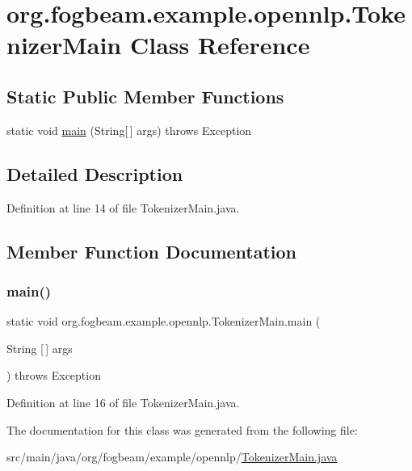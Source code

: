 \hypertarget{classorg_1_1fogbeam_1_1example_1_1opennlp_1_1_tokenizer_main}{}\section{org.\+fogbeam.\+example.\+opennlp.\+Tokenizer\+Main Class Reference}
\label{classorg_1_1fogbeam_1_1example_1_1opennlp_1_1_tokenizer_main}
\subsection*{Static Public Member Functions}
\begin{DoxyCompactItemize}
\item 
static void \hyperlink{classorg_1_1fogbeam_1_1example_1_1opennlp_1_1_tokenizer_main_a957e2ce0b42d88a63fe225dd240d5e95}{main} (String\mbox{[}$\,$\mbox{]} args)  throws Exception 	
\end{DoxyCompactItemize}


\subsection{Detailed Description}


Definition at line 14 of file Tokenizer\+Main.\+java.



\subsection{Member Function Documentation}
\hypertarget{classorg_1_1fogbeam_1_1example_1_1opennlp_1_1_tokenizer_main_a957e2ce0b42d88a63fe225dd240d5e95}{}\label{classorg_1_1fogbeam_1_1example_1_1opennlp_1_1_tokenizer_main_a957e2ce0b42d88a63fe225dd240d5e95} 
\subsubsection{\texorpdfstring{main()}{main()}}
{\footnotesize\ttfamily static void org.\+fogbeam.\+example.\+opennlp.\+Tokenizer\+Main.\+main (\begin{DoxyParamCaption}\item[{String \mbox{[}$\,$\mbox{]}}]{args }\end{DoxyParamCaption}) throws Exception\hspace{0.3cm}{\ttfamily [static]}}



Definition at line 16 of file Tokenizer\+Main.\+java.



The documentation for this class was generated from the following file\+:\begin{DoxyCompactItemize}
\item 
src/main/java/org/fogbeam/example/opennlp/\hyperlink{org_2fogbeam_2example_2opennlp_2_tokenizer_main_8java}{Tokenizer\+Main.\+java}\end{DoxyCompactItemize}
